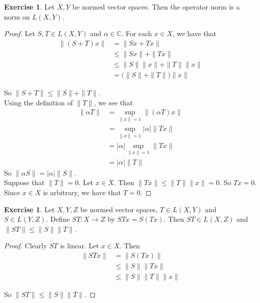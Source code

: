 \documentclass[12pt]{amsart}
\theoremstyle{definition}
\newtheorem{ex}[definition]{Exercise}
\newcommand{\al}{\alpha}
\newcommand{\C}{\mathbb{C}}
\DeclareMathOperator*{\0}{\mbf{0}}
\DeclareMathOperator*{\1}{\mbf{1}}
\newcommand{\lex}[1]{\label{ex:#1}}
\begin{document}
	\begin{ex} \lex{42008}
		Let $X, Y$ be normed vector spaces. Then the operator norm is a norm on $L(X,Y)$.
	\end{ex}
	
	\begin{proof}
		Let $S,T \in L(X,Y)$ and $\al \in \C$. For each $x \in X$, we have that 
		\begin{align*}
			\|(S+T)x \|
			&= \|Sx+Tx \|\\
			& \leq \|Sx \|+ \|Tx \|\\
			&\leq \|S \|\|x \|+ \|T \|\|x \|\\
			&= \big(\|S \|+ \|T \|\big) \|x \|
		\end{align*}
		
		So $\|S+T \|\leq \|S \|+ \|T \|$.\vspace{1cm}\\
		
		Using the definition of $\|T \|$, we see that 
		\begin{align*}
			\|\al T \|
			&= \sup_{\|x \|=1} \|(\al T)x \|\\
			&= \sup_{\|x \|=1} \vert \al \vert \|Tx \|\\
			&=\vert \al \vert \sup_{\|x \|=1} \|Tx \|\\
			&=\vert \al \vert \|T \|
		\end{align*} 
		So $\|\al S \|= \vert \al \vert \|S \|$. \vspace{1cm}\\ Suppose that $\|T \|= 0$. Let $x \in X$. Then $\|T x\|\leq \|T \|\|x \|= 0$. So $Tx=0$. Since $x \in X$ is arbitrary, we have that $T=0$. 
	\end{proof}
	
	\begin{ex} \lex{42009}
		Let $X,Y,Z$ be normed vector spaces, $T \in L(X,Y)$ and $S \in L(Y,Z)$. Define $ST:X \rightarrow Z$ by $STx = S(Tx)$. Then $ST \in L(X,Z)$ and $\|ST \|\leq \|S \|\|T \|$. 
	\end{ex}
	
	\begin{proof}
		Clearly $ST$ is linear. Let $x \in X$. Then 
		\begin{align*}
			\|ST x \|
			& = \|S(Tx) \|\\
			& \leq \|S \|\|Tx \|\\
			& \leq \|S \|\|T \|\|x \|
		\end{align*}
		
		So $\|ST \|\leq \|S \|\|T \|$.
	\end{proof}
	
\end{document}

